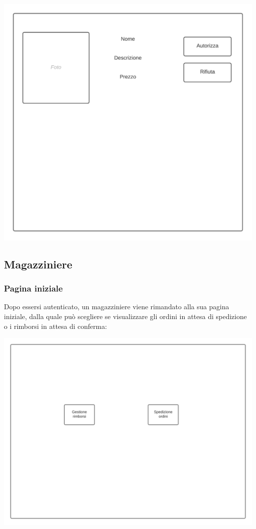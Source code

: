 \documentclass[12pt]{article}
\begin{document}
\begin{center}
\includegraphics[height=0.3\textheight]{Mockup/Centralinista/DettagliVendita}
\end{center}

\newpage

\subsection{Magazziniere}
\subsubsection{Pagina iniziale}
Dopo essersi autenticato, un magazziniere viene rimandato alla sua pagina iniziale, dalla quale può scegliere se visualizzare gli ordini in attesa di spedizione o i rimborsi in attesa di conferma:

\begin{center}
\includegraphics[height=0.3\textheight]{Mockup/Magazziniere/PaginaIniziale}
\end{center}
\end{document}
